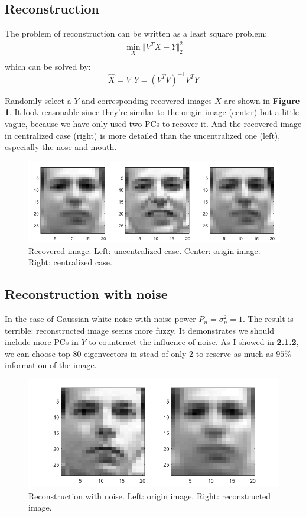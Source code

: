 \documentclass{article}
\begin{document}
\subsection{Reconstruction}
The problem of reconstruction can be written as a least square problem:
\[
\begin{aligned}
\min_X\Vert V^TX-Y\Vert_2^2\\
\end{aligned}
\]
which can be solved by:
\[
\hat{X}=V^\dagger Y=(V^TV)^{-1}V^TY
\]

Randomly select a $Y$ and corresponding recovered images $\hat{X}$ are shown in \textbf{Figure \ref{fig13}}. It look reasonable since they're similar to the origin image (center) but a little vague, because we have only used two PCs to recover it. And the recovered image in centralized case (right) is more detailed than the uncentralized one (left), especially the nose and mouth.

\begin{figure}[H]
	\centering
	\includegraphics[scale=0.6]{figure13}
	\caption{Recovered image. Left: uncentralized case. Center: origin image. Right: centralized case.}
	\label{fig13}
\end{figure}

\subsection{Reconstruction with noise}
In the case of Gaussian white noise with noise power $P_n=\sigma_n^2=1$. The result is terrible: reconstructed image seems more fuzzy. It demonstrates we should include more PCs in $Y$ to counteract the influence of noise. As I showed in \textbf{2.1.2}, we can choose top 80 eigenvectors in stead of only 2 to reserve as much as $95\%$ information of the image.
\begin{figure}[H]
	\centering
	\includegraphics[scale=0.6]{figure14}
	\caption{Reconstruction with noise. Left: origin image. Right: reconstructed image.}
	\label{fig14}
\end{figure}
\end{document}
